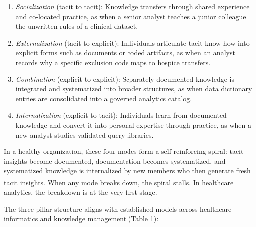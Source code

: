 \documentclass[
  american,
  11pt,
  letterpaper,
  oneside  ,captions=tableheading
]{scrartcl}
\providecommand{\tightlist}{%
  \setlength{\itemsep}{0pt}\setlength{\parskip}{0pt}}
\begin{document}
\begin{enumerate}
\def\labelenumi{\arabic{enumi}.}
\tightlist
\item
  \emph{Socialization} (tacit to tacit): Knowledge transfers through
  shared experience and co-located practice, as when a senior analyst
  teaches a junior colleague the unwritten rules of a clinical dataset.
\item
  \emph{Externalization} (tacit to explicit): Individuals articulate
  tacit know-how into explicit forms such as documents or coded
  artifacts, as when an analyst records why a specific exclusion code
  maps to hospice transfers.
\item
  \emph{Combination} (explicit to explicit): Separately documented
  knowledge is integrated and systematized into broader structures, as
  when data dictionary entries are consolidated into a governed
  analytics catalog.
\item
  \emph{Internalization} (explicit to tacit): Individuals learn from
  documented knowledge and convert it into personal expertise through
  practice, as when a new analyst studies validated query libraries.
\end{enumerate}

In a healthy organization, these four modes form a self-reinforcing
spiral: tacit insights become documented, documentation becomes
systematized, and systematized knowledge is internalized by new members
who then generate fresh tacit
insights\textsuperscript{}. When any mode
breaks down, the spiral stalls. In healthcare analytics, the breakdown
is at the very first stage.

The three-pillar structure aligns with established models across
healthcare informatics and knowledge management (Table 1):
\end{document}

